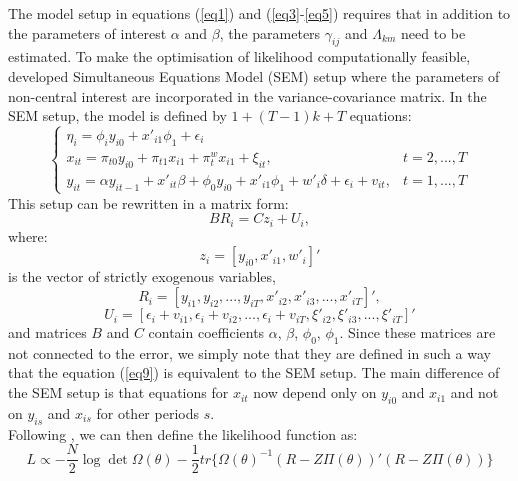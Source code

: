 \documentclass[a4paper]{article}
\begin{document}
\indent The model setup in equations (\ref{eq1}) and (\ref{eq3}-\ref{eq5}) requires that in addition to the parameters of interest $\alpha$ and $\beta$, the parameters $\gamma_{ij}$ and $\Lambda_{km}$ need to be estimated.
To make the optimisation of likelihood computationally feasible, \citet{Moral+2013} developed Simultaneous Equations Model (SEM) setup where the parameters of non-central interest are incorporated in the variance-covariance matrix.
In the SEM setup, the model is defined by $1 + (T - 1)k + T$ equations:
\[
\begin{cases}
    \eta_i = \phi_i y_{i0} + x'_{i1} \phi_1 + \epsilon_i &  \\
    x_{it} = \pi_{t0} y_{i0} + \pi_{t1} x_{i1} + \pi^w_t x_{i1} + \xi_{it}, & t = 2, ..., T \\
    y_{it} = \alpha y_{it-1} + x'_{it} \beta + \phi_0 y_{i0} + x'_{i1} \phi_1 + w'_i \delta + \epsilon_i + v_{it}, & t = 1, ..., T
\end{cases}
\]
This setup can be rewritten in a matrix form:
\begin{equation}\label{eq9}
    B R_i = C z_i + U_i,
\end{equation}
\noindent where:
\begin{equation}\label{eq10}
    z_i = [y_{i0}, x'_{i1}, w'_i]'
\end{equation}
is the vector of strictly exogenous variables,
\begin{equation}\label{eq11}
    R_i = [y_{i1}, y_{i2}, ..., y_{iT}, x'_{i2}, x'_{i3}, ..., x'_{iT}]',
\end{equation}
\begin{equation}\label{eq12}
    U_i = [\epsilon_i + v_{i1}, \epsilon_i + v_{i2}, ..., \epsilon_i + v_{iT}, \xi'_{i2}, \xi'_{i3}, ..., \xi'_{iT}]'
\end{equation}
\noindent and matrices $B$ and $C$ contain coefficients $\alpha$, $\beta$, $\phi_0$, $\phi_1$.
Since these matrices are not connected to the error, we simply note that they are defined in such a way that the equation (\ref{eq9}) is equivalent to the SEM setup.
The main difference of the SEM setup is that equations for $x_{it}$ now depend only on $y_{i0}$ and $x_{i1}$ and not on $y_{is}$ and $x_{is}$ for other periods $s$.\\
\indent Following \citet{Moral+2013}, we can then define the likelihood function as:
\begin{equation}\label{eq13}
    L \propto - \frac{N}{2} \log \det \Omega(\theta) - \frac{1}{2} tr \{ \Omega(\theta)^{-1} (R - Z \Pi(\theta))' (R - Z \Pi(\theta)) \}
\end{equation}
\end{document}
